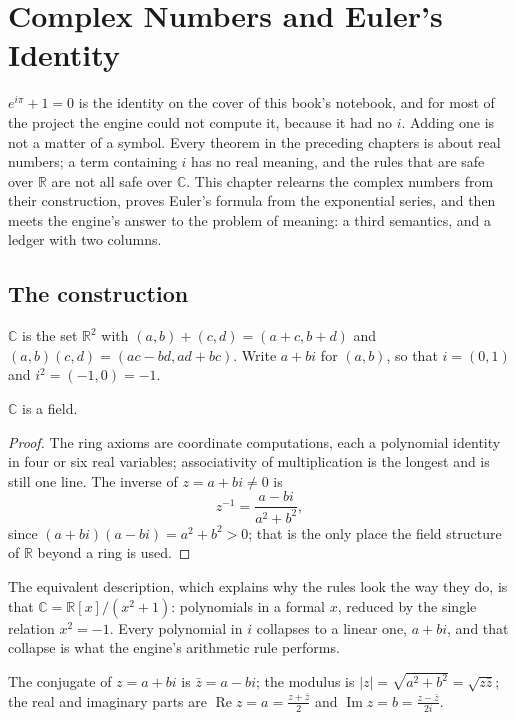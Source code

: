 \chapter{Complex Numbers and Euler's Identity}\label{ch:cx}

$e^{i\pi} + 1 = 0$ is the identity on the cover of this book's notebook, and for most of the
project the engine could not compute it, because it had no $i$. Adding one is not a matter of a
symbol. Every theorem in the preceding chapters is about real numbers; a term containing $i$ has no
real meaning, and the rules that are safe over $\mathbb{R}$ are not all safe over $\mathbb{C}$.
This chapter relearns the complex numbers from their construction, proves Euler's formula from the
exponential series, and then meets the engine's answer to the problem of meaning: a third
semantics, and a ledger with two columns.

\section{The construction}

\begin{definition}
  $\mathbb{C}$ is the set $\mathbb{R}^2$ with $(a, b) + (c, d) = (a + c, b + d)$ and
  $(a, b)(c, d) = (ac - bd, ad + bc)$. Write $a + bi$ for $(a, b)$, so that $i = (0, 1)$ and
  $i^2 = (-1, 0) = -1$.
\end{definition}

\begin{theorem}
  $\mathbb{C}$ is a field.
\end{theorem}
\begin{proof}
  The ring axioms are coordinate computations, each a polynomial identity in four or six real
  variables; associativity of multiplication is the longest and is still one line. The inverse of
  $z = a + bi \neq 0$ is
  \[
    z^{-1} = \frac{a - bi}{a^2 + b^2},
  \]
  since $(a + bi)(a - bi) = a^2 + b^2 > 0$; that is the only place the field structure of
  $\mathbb{R}$ beyond a ring is used.
\end{proof}

The equivalent description, which explains why the rules look the way they do, is that $\mathbb{C}
= \mathbb{R}[x]/(x^2 + 1)$: polynomials in a formal $x$, reduced by the single relation $x^2 = -1$.
Every polynomial in $i$ collapses to a linear one, $a + bi$, and that collapse is what the engine's
arithmetic rule performs.

\begin{definition}
  The conjugate of $z = a + bi$ is $\bar z = a - bi$; the modulus is $|z| = \sqrt{a^2 + b^2} =
  \sqrt{z\bar z}$; the real and imaginary parts are $\operatorname{Re} z = a = \frac{z + \bar
  z}{2}$ and $\operatorname{Im} z = b = \frac{z - \bar z}{2i}$.
\end{definition}

